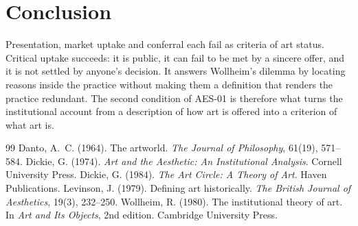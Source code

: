 \documentclass{situationist-preprint}
\begin{document}
\section{Conclusion}

Presentation, market uptake and conferral each fail as criteria of art status. Critical uptake succeeds: it is public, it can fail to be met by a sincere offer, and it is not settled by anyone's decision. It answers Wollheim's dilemma by locating reasons inside the practice without making them a definition that renders the practice redundant. The second condition of AES-01 is therefore what turns the institutional account from a description of how art is offered into a criterion of what art is.

\begin{thebibliography}{99}\small
{} Danto, A.~C. (1964). The artworld. \emph{The Journal of Philosophy}, 61(19), 571--584.
 Dickie, G. (1974). \emph{Art and the Aesthetic: An Institutional Analysis}. Cornell University Press.
 Dickie, G. (1984). \emph{The Art Circle: A Theory of Art}. Haven Publications.
 Levinson, J. (1979). Defining art historically. \emph{The British Journal of Aesthetics}, 19(3), 232--250.
 Wollheim, R. (1980). The institutional theory of art. In \emph{Art and Its Objects}, 2nd edition. Cambridge University Press.
\end{thebibliography}
\end{document}
